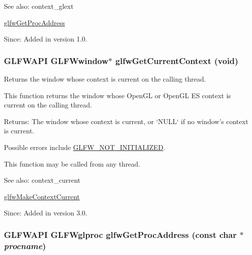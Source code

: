 \begin{Desc}
\item[See also:]context\_\-glext 

\hyperlink{group__context_g0e8af175218929615c16e74938c10f2a}{glfwGetProcAddress}\end{Desc}
\begin{Desc}
\item[Since:]Added in version 1.0. \end{Desc}
\hypertarget{group__context_gc28d98c655377d81a516bf5ef90780c8}{
\subsubsection[glfwGetCurrentContext]{\setlength{\rightskip}{0pt plus 5cm}GLFWAPI {\bf GLFWwindow}$\ast$ glfwGetCurrentContext (void)}}
\label{group__context_gc28d98c655377d81a516bf5ef90780c8}


Returns the window whose context is current on the calling thread. 

This function returns the window whose OpenGL or OpenGL ES context is current on the calling thread.

\begin{Desc}
\item[Returns:]The window whose context is current, or `NULL` if no window's context is current.\end{Desc}
Possible errors include \hyperlink{group__errors_g2374ee02c177f12e1fa76ff3ed15e14a}{GLFW\_\-NOT\_\-INITIALIZED}.

This function may be called from any thread.

\begin{Desc}
\item[See also:]context\_\-current 

\hyperlink{group__context_gfd76c93e15ec8b0b90506a9936a46185}{glfwMakeContextCurrent}\end{Desc}
\begin{Desc}
\item[Since:]Added in version 3.0. \end{Desc}
\hypertarget{group__context_g0e8af175218929615c16e74938c10f2a}{
\subsubsection[glfwGetProcAddress]{\setlength{\rightskip}{0pt plus 5cm}GLFWAPI {\bf GLFWglproc} glfwGetProcAddress (const char $\ast$ {\em procname})}}
\label{group__context_g0e8af175218929615c16e74938c10f2a}


